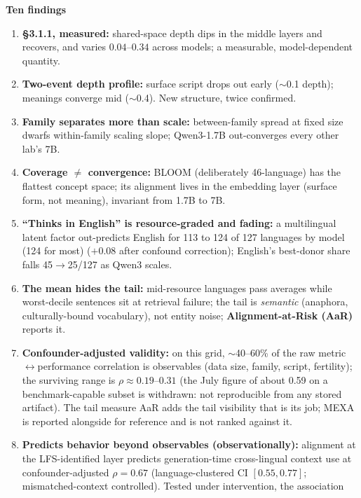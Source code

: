 \documentclass[10pt,a4paper]{article}
\begin{document}
\vspace{1.6mm}
{\normalsize\textbf{Ten findings}}\\[-3.2mm]
\begin{enumerate}[leftmargin=1.35em, itemsep=0.35mm, parsep=0pt, topsep=1mm]
\small
\item \textbf{\S3.1.1, measured:} shared-space depth dips in the middle layers and recovers, and varies
$0.04$--$0.34$ across models; a measurable, model-dependent quantity.
\item \textbf{Two-event depth profile:} surface script drops out early ($\sim$0.1
depth); meanings converge mid ($\sim$0.4). New structure, twice confirmed.
\item \textbf{Family separates more than scale:} between-family spread at fixed size dwarfs
within-family scaling slope; Qwen3-1.7B out-converges every other lab's 7B.
\item \textbf{Coverage $\neq$ convergence:} BLOOM (deliberately 46-language)
has the flattest concept space; its alignment lives in the embedding layer (surface form, not meaning), invariant from 1.7B to 7B.
\item \textbf{``Thinks in English'' is resource-graded and fading:} a
multilingual latent factor out-predicts English for 113 to 124 of 127 languages by model (124 for most)
($+0.08$ after confound correction); English's best-donor share falls
45$\to$25/127 as Qwen3 scales.
\item \textbf{The mean hides the tail:} mid-resource languages pass averages
while worst-decile sentences sit at retrieval failure; the tail is
\emph{semantic} (anaphora, culturally-bound vocabulary), not entity noise; \textbf{Alignment-at-Risk (AaR)} reports it.
\item \textbf{Confounder-adjusted validity:} on this grid, $\sim$40--60\% of the raw
metric$\leftrightarrow$performance correlation is observables (data size,
family, script, fertility); the surviving range is $\rho \approx 0.19$--$0.31$ (the July figure of about 0.59 on a benchmark-capable subset is withdrawn: not reproducible from any stored artifact). The tail measure AaR adds the tail visibility that is its job; MEXA is reported alongside for reference and is not ranked against it.
\item \textbf{Predicts behavior beyond observables (observationally):}
alignment at the LFS-identified layer predicts generation-time cross-lingual
context use at confounder-adjusted $\rho = 0.67$ (language-clustered CI $[0.55, 0.77]$;
mismatched-context controlled). Tested under intervention, the association

\end{enumerate}
\end{document}
